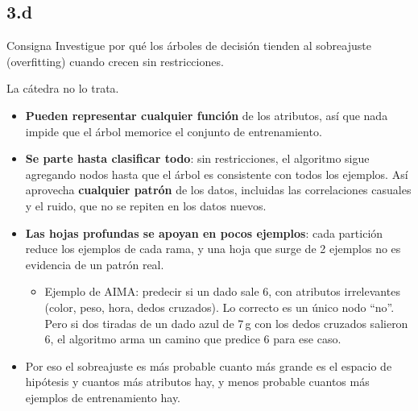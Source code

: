 \documentclass[11pt,a4paper]{article}
\begin{document}
\subsection{3.d}

\begin{enunciado}{Consigna}
Investigue por qué los árboles de decisión tienden al sobreajuste (overfitting) cuando crecen sin restricciones.
\end{enunciado}

La cátedra no lo trata.
\begin{itemize}
  \item \textbf{Pueden representar cualquier función} de los atributos, así que nada impide que el árbol memorice el conjunto de entrenamiento.
  \item \textbf{Se parte hasta clasificar todo}: sin restricciones, el algoritmo sigue agregando nodos hasta que el árbol es consistente con todos los ejemplos. Así aprovecha \textbf{cualquier patrón} de los datos, incluidas las correlaciones casuales y el ruido, que no se repiten en los datos nuevos.
  \item \textbf{Las hojas profundas se apoyan en pocos ejemplos}: cada partición reduce los ejemplos de cada rama, y una hoja que surge de 2 ejemplos no es evidencia de un patrón real.
  \begin{itemize}
    \item Ejemplo de AIMA: predecir si un dado sale 6, con atributos irrelevantes (color, peso, hora, dedos cruzados). Lo correcto es un único nodo ``no''. Pero si dos tiradas de un dado azul de 7\,g con los dedos cruzados salieron 6, el algoritmo arma un camino que predice 6 para ese caso.
  \end{itemize}
  \item Por eso el sobreajuste es más probable cuanto más grande es el espacio de hipótesis y cuantos más atributos hay, y menos probable cuantos más ejemplos de entrenamiento hay.
\end{itemize}
\end{document}
